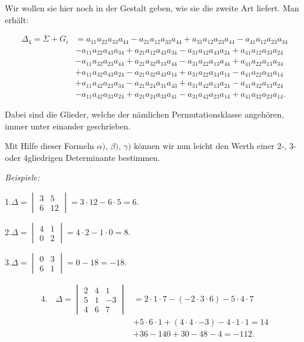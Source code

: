 \documentclass[11pt]{article}
\let\Delta\varDelta
\let\Sigma\varSigma
\begin{document}
Wir wollen sie hier noch in der Gestalt geben, wie sie die zweite Art liefert. Man erhält:

\[
\begin{aligned}
\Delta_4 = \Sigma + G_i &= a_{11}a_{22}a_{33}a_{44} - a_{21}a_{12}a_{33}a_{44} + a_{31}a_{12}a_{23}a_{44} - a_{41}a_{12}a_{23}a_{34}\\
&- a_{11}a_{22}a_{43}a_{34} + a_{21}a_{12}a_{43}a_{34} - a_{31}a_{12}a_{43}a_{24} + a_{41}a_{12}a_{33}a_{24}\\
&- a_{11}a_{32}a_{23}a_{44} + a_{21}a_{32}a_{13}a_{44} - a_{31}a_{22}a_{13}a_{44} + a_{41}a_{22}a_{13}a_{34}\\
&+ a_{11}a_{32}a_{43}a_{24} - a_{21}a_{32}a_{43}a_{14} + a_{31}a_{22}a_{34}a_{14} - a_{41}a_{22}a_{33}a_{14}\\
&+ a_{11}a_{42}a_{23}a_{34} - a_{21}a_{24}a_{31}a_{43} + a_{31}a_{42}a_{13}a_{24} - a_{41}a_{32}a_{13}a_{24}\\
&- a_{11}a_{42}a_{33}a_{24} + a_{21}a_{24}a_{33}a_{41} - a_{31}a_{42}a_{23}a_{14} + a_{41}a_{32}a_{23}a_{14}.
\end{aligned}
\]

Dabei sind die Glieder, welche der nämlichen Permutationsklasse angehören, immer unter einander geschrieben.

Mit Hilfe dieser Formeln $\alpha)$, $\beta)$, $\gamma)$ können wir nun leicht den Werth einer 2-, 3- oder 4gliedrigen Determinante bestimmen.

\textit{Beispiele:}

1.\quad $\Delta = \begin{vmatrix} 3 & 5 \\ 6 & 12 \end{vmatrix} = 3\cdot 12 - 6\cdot 5 = 6.$

2.\quad $\Delta = \begin{vmatrix} 4 & 1 \\ 0 & 2 \end{vmatrix} = 4\cdot 2 - 1\cdot 0 = 8.$

3.\quad $\Delta = \begin{vmatrix} 0 & 3 \\ 6 & 1 \end{vmatrix} = 0 - 18 = -18.$

\[
\begin{aligned}
4.\quad \Delta = \begin{vmatrix} 2 & 4 & 1 \\ 5 & 1 & -3 \\ 4 & 6 & 7 \end{vmatrix} &= 2\cdot 1\cdot 7 - (-2\cdot 3\cdot 6) - 5\cdot 4\cdot 7\\
&+ 5\cdot 6\cdot 1 + (4\cdot 4\cdot{-3}) - 4\cdot 1\cdot 1 = 14\\
&+ 36 - 140 + 30 - 48 - 4 = -112.
\end{aligned}
\]
\end{document}
